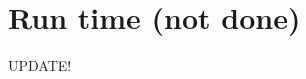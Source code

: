 \documentclass[11pt]{report}
\begin{document}
\section{Run time (not done)}
UPDATE!

\end{document}
